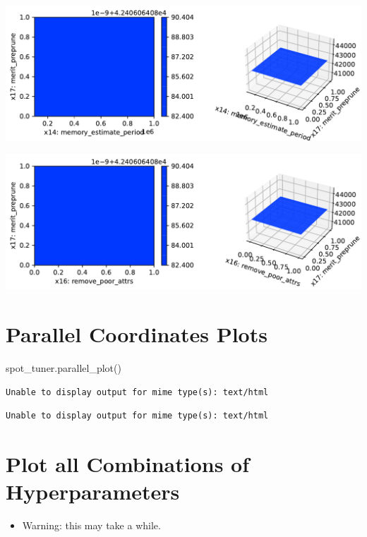 \documentclass[
  letterpaper,
  DIV=11,
  numbers=noendperiod]{scrreprt}
\newenvironment{Shaded}{\begin{snugshade}}{\end{snugshade}}
\newcommand{\NormalTok}[1]{\textcolor[rgb]{0.00,0.23,0.31}{#1}}
\providecommand{\tightlist}{%
  \setlength{\itemsep}{0pt}\setlength{\parskip}{0pt}}\usepackage{longtable,booktabs,array}
\begin{document}
\includegraphics{024_spot_hpt_river_friedman_hatr_files/figure-pdf/cell-42-output-105.pdf}

\includegraphics{024_spot_hpt_river_friedman_hatr_files/figure-pdf/cell-42-output-106.pdf}

\section{Parallel Coordinates Plots}\label{parallel-coordinates-plots}

\begin{Shaded}
\begin{Highlighting}[]
\NormalTok{spot\_tuner.parallel\_plot()}
\end{Highlighting}
\end{Shaded}

\begin{verbatim}
Unable to display output for mime type(s): text/html
\end{verbatim}

\begin{verbatim}
Unable to display output for mime type(s): text/html
\end{verbatim}

\section{Plot all Combinations of
Hyperparameters}\label{plot-all-combinations-of-hyperparameters}

\begin{itemize}
\tightlist
\item
  Warning: this may take a while.
\end{itemize}
\end{document}
